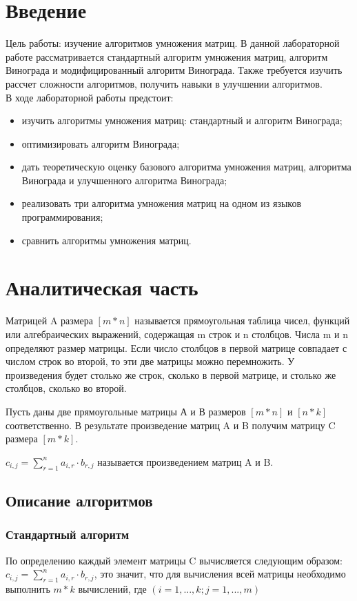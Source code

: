 \documentclass[12pt,a4paper]{article}
\begin{document}
\section*{\Huge Введение}
Цель работы: изучение алгоритмов умножения матриц. В данной лабораторной работе рассматривается стандартный алгоритм умножения матриц, алгоритм Винограда и модифицированный алгоритм Винограда.  Также требуется изучить рассчет сложности алгоритмов, получить навыки в улучшении алгоритмов.\\
В ходе лабораторной работы предстоит:
\begin{itemize}
	\item изучить алгоритмы умножения матриц: стандартный и алгоритм Винограда; 
	\item оптимизировать алгоритм Винограда; 
	\item дать теоретическую оценку базового алгоритма умножения матриц, алгоритма Винограда и улучшенного алгоритма Винограда;
	\item реализовать три алгоритма умножения матриц на одном из языков программирования;  
	\item сравнить алгоритмы умножения матриц.
\end{itemize}
\clearpage

\section{Аналитическая часть}
Матрицей A размера $[m*n]$ называется прямоугольная таблица
чисел, функций или алгебраических выражений, содержащая m строк и n столбцов. Числа m и n определяют размер матрицы. Если число столбцов в первой матрице совпадает с числом строк во второй, то эти две матрицы можно перемножить. У произведения будет столько же строк, сколько в первой матрице, и столько же столбцов, сколько во второй.
	    
Пусть даны две прямоугольные матрицы А и В размеров $[m * n]$ и $[n * k]$ соответственно.  
В результате произведение матриц A и B получим матрицу C размера $[m *  k]$.


$c_{i,j} = \sum\limits_{r=1}^n a_{i,r}\cdot b_{r,j}$ называется произведением матриц A и B.

\newpage
\subsection{Описание алгоритмов}

\subsubsection{Стандартный алгоритм}
По определению каждый элемент матрицы C вычисляется следующим образом:\\
$c_{i,j} = \sum\limits_{r=1}^n a_{i,r}\cdot b_{r,j}$, это значит, что для вычисления всей матрицы необходимо выполнить $m *  k$ вычислений, где $(i=1,...,k; j=1,...,m)$
\end{document}
